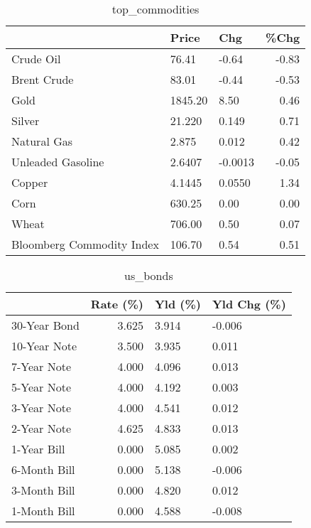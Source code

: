 \documentclass{article}%
\begin{document}
\begin{table}[htbp]%
\caption{top\_commodities}%
\centering%
\begin{adjustbox}{width=1\textwidth}%
\begin{tabular}{lllr}
\toprule
                          &   Price &     Chg &  \%Chg \\
\midrule
               Crude Oil  &   76.41 &   -0.64 & -0.83 \\
             Brent Crude  &   83.01 &   -0.44 & -0.53 \\
                    Gold  & 1845.20 &    8.50 &  0.46 \\
                  Silver  &  21.220 &   0.149 &  0.71 \\
             Natural Gas  &   2.875 &   0.012 &  0.42 \\
       Unleaded Gasoline  &  2.6407 & -0.0013 & -0.05 \\
                  Copper  &  4.1445 &  0.0550 &  1.34 \\
                    Corn  &  630.25 &    0.00 &  0.00 \\
                   Wheat  &  706.00 &    0.50 &  0.07 \\
Bloomberg Commodity Index &  106.70 &    0.54 &  0.51 \\
\bottomrule
\end{tabular}
%
\end{adjustbox}%
\end{table}

%


\begin{table}[htbp]%
\caption{us\_bonds}%
\centering%
\begin{adjustbox}{width=1\textwidth}%
\begin{tabular}{lrll}
\toprule
             &  Rate (\%) & Yld (\%) & Yld Chg (\%) \\
\midrule
30-Year Bond &     3.625 &   3.914 &      -0.006 \\
10-Year Note &     3.500 &   3.935 &       0.011 \\
 7-Year Note &     4.000 &   4.096 &       0.013 \\
 5-Year Note &     4.000 &   4.192 &       0.003 \\
 3-Year Note &     4.000 &   4.541 &       0.012 \\
 2-Year Note &     4.625 &   4.833 &       0.013 \\
 1-Year Bill &     0.000 &   5.085 &       0.002 \\
6-Month Bill &     0.000 &   5.138 &      -0.006 \\
3-Month Bill &     0.000 &   4.820 &       0.012 \\
1-Month Bill &     0.000 &   4.588 &      -0.008 \\
\bottomrule
\end{tabular}
%
\end{adjustbox}%
\end{table}
\end{document}
